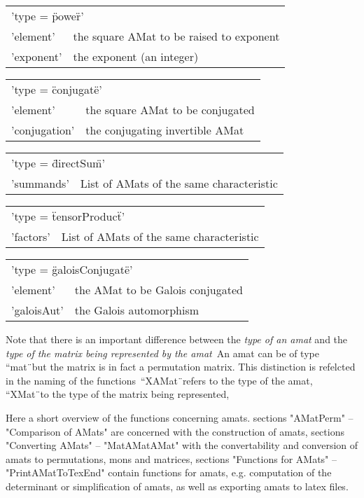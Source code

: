 \begin{tabular}{p{2.5cm}p{9cm}}
\multicolumn{2}{l}{'type = \"power\"\:'}\\
'element'      & the square AMat to be raised to exponent\\
'exponent'     & the exponent (an integer)
\end{tabular}

\begin{tabular}{p{2.5cm}p{9cm}}
\multicolumn{2}{l}{'type = \"conjugate\"\:'}\\
'element'      & the square AMat to be conjugated\\
'conjugation'  & the conjugating invertible AMat
\end{tabular}

\begin{tabular}{p{2.5cm}p{9cm}}
\multicolumn{2}{l}{'type = \"directSum\"\:'}\\
'summands'     & List of AMats of the same characteristic
\end{tabular}

\begin{tabular}{p{2.5cm}p{9cm}}
\multicolumn{2}{l}{'type = \"tensorProduct\"\:'}\\
'factors'      & List of AMats of the same characteristic
\end{tabular}

\begin{tabular}{p{2.5cm}p{9cm}}
\multicolumn{2}{l}{'type = \"galoisConjugate\"\:'}\\
'element'      & the AMat to be Galois conjugated\\
'galoisAut'    & the Galois automorphism
\end{tabular}

\bigskip
Note that there is an important difference between the 
{\em type of an amat} and the 
{\em type of the matrix being represented by the amat}\:\ 
An amat can be of type ``mat\"\ but the matrix is in fact
a permutation matrix. This distinction is refelcted in the naming
of the functions\:\ ``XAMat\"\ refers to the type of the 
amat, ``XMat\"\ to the type of the matrix being represented,

Here a short overview of the functions concerning amats. 
sections "AMatPerm" -- "Comparison of AMats" are concerned with
the construction of amats, sections "Converting AMats" -- "MatAMatAMat" 
with the convertability and conversion of amats to permutations, mons
and matrices, sections 
"Functions for AMats" -- "PrintAMatToTexEnd"
contain functions for amats, e.g. computation of the determinant or 
simplification of amats, as well as exporting amats to latex files.

